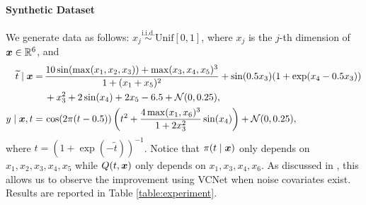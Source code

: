 \paragraph{Synthetic Dataset}
We generate data as follows: $
x_j \overset{\text{i.i.d.}}{\sim} \text{Unif}[0,1]$, where $x_j$ is the $j$-th dimension of $\boldsymbol{x}\in\mathbb{R}^6$, and
\begin{align*}
\widetilde{t}\mid\boldsymbol{x} = & \,\frac{10\sin(\max(x_{1},x_{2},x_{3}))+\max(x_{3},x_{4},x_{5})^{3}}{1+(x_{1}+x_{5})^{2}}+\sin(0.5x_{3})(1+\exp(x_{4}-0.5x_{3}))\\
& \,+x_{3}^{2}+2\sin(x_{4})+2x_{5}-6.5+\mathcal{N}(0,0.25),\\
y\mid\boldsymbol{x},t = &\, \cos(2\pi(t-0.5))\left(t^{2}+\frac{4\max(x_{1},x_{6})^{3}}{1+2x_{3}^{2}}\sin(x_{4})\right)+\mathcal{N}(0,0.25),
\end{align*}
where $t=(1+\exp(-\tilde t))^{-1}$. Notice that $\pi(t\mid\boldsymbol{x})$ only
depends on $x_{1},x_{2},x_{3},x_{4},x_{5}$ while $Q(t,\boldsymbol{x})$ only
depends on $x_{1},x_{3},x_{4},x_{6}$. As discussed in \cite{shi2019adapting}, this allows us to observe the improvement using VCNet when noise covariates exist. Results are reported in Table \ref{table:experiment}.

